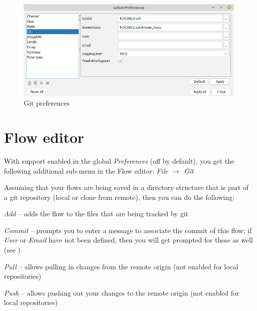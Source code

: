 \documentclass[a4paper]{book}
\begin{document}
\begin{figure}[htb]
  \centering
  \includegraphics[width=12.0cm]{images/preferences.png}
  \caption{Git preferences}
  \label{preferences}
\end{figure}


\section{Flow editor}
With support enabled in the global \textit{Preferences} (off by default), you get the following
additional sub-menu in the Flow editor: \textit{File $\rightarrow$ Git}

Assuming that your flows are being saved in a directory structure that is part of a git
repository (local or clone from remote), then you can do the following:
\begin{tight_itemize}
    \item \textit{Add} -- adds the flow to the files that are being tracked by git
    \item \textit{Commit} -- prompts you to enter a message to associate the commit of this flow;
    if \textit{User} or \textit{Email} have not been defined, then you will get prompted
    for these as well (see \cite{git-config})
    \item \textit{Pull} -- allows pulling in changes from the remote origin (not enabled for local repositories)
    \item \textit{Push} -- allows pushing out your changes to the remote origin (not enabled for local repositories)
\end{tight_itemize}



\end{document}
